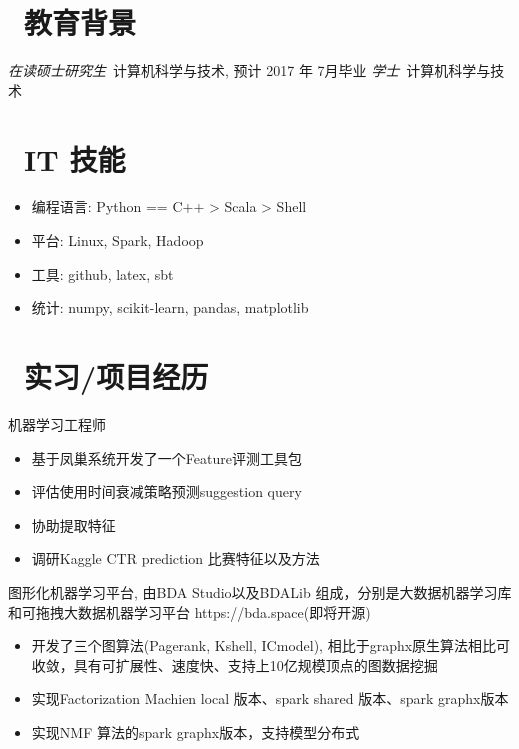 \documentclass{resume}
\begin{document}


 
\section{\faGraduationCap\  教育背景}
\textit{在读硕士研究生}\ 计算机科学与技术, 预计 2017 年 7月毕业
\textit{学士}\ 计算机科学与技术

\section{\faCogs\ IT 技能}
\begin{itemize}[parsep=0.5ex]
  \item 编程语言: Python == C++ > Scala > Shell
  \item 平台: Linux, Spark, Hadoop
  \item 工具: github, latex, sbt
  \item 统计: numpy, scikit-learn, pandas, matplotlib
\end{itemize}

\section{\faUsers\ 实习/项目经历}
机器学习工程师
\begin{itemize}
  \item 基于凤巢系统开发了一个Feature评测工具包
  \item 评估使用时间衰减策略预测suggestion query
  \item 协助提取特征
  \item 调研Kaggle CTR prediction 比赛特征以及方法
\end{itemize}

\begin{onehalfspacing}
图形化机器学习平台, 由BDA Studio以及BDALib 组成，分别是大数据机器学习库和可拖拽大数据机器学习平台 https://bda.space(即将开源)
\begin{itemize}
  \item 开发了三个图算法(Pagerank, Kshell, ICmodel), 相比于graphx原生算法相比可收敛，具有可扩展性、速度快、支持上10亿规模顶点的图数据挖掘
  \item 实现Factorization Machien local 版本、spark shared 版本、spark graphx版本
  \item 实现NMF 算法的spark graphx版本，支持模型分布式
\end{itemize}
\end{onehalfspacing}
\end{document}
